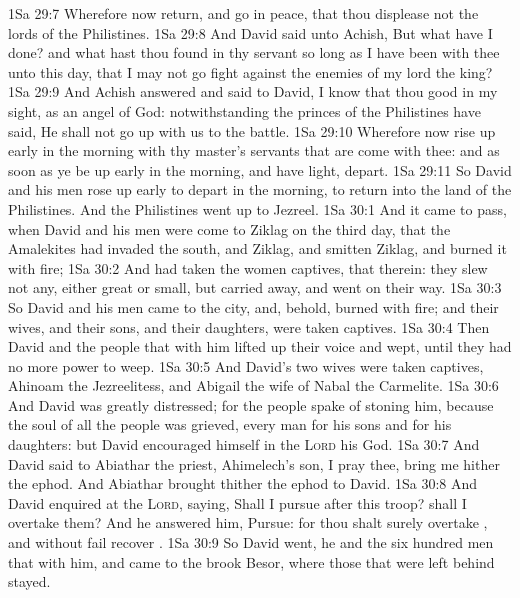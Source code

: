 \vs 1Sa 29:7 Wherefore now return, and go in peace, that thou displease not the lords of the Philistines.
\vs 1Sa 29:8 And David said unto Achish, But what have I done? and what hast thou found in thy servant so long as I have been with thee unto this day, that I may not go fight against the enemies of my lord the king?
\vs 1Sa 29:9 And Achish answered and said to David, I know that thou  good in my sight, as an angel of God: notwithstanding the princes of the Philistines have said, He shall not go up with us to the battle.
\vs 1Sa 29:10 Wherefore now rise up early in the morning with thy master's servants that are come with thee: and as soon as ye be up early in the morning, and have light, depart.
\vs 1Sa 29:11 So David and his men rose up early to depart in the morning, to return into the land of the Philistines. And the Philistines went up to Jezreel.
\vs 1Sa 30:1 And it came to pass, when David and his men were come to Ziklag on the third day, that the Amalekites had invaded the south, and Ziklag, and smitten Ziklag, and burned it with fire;
\vs 1Sa 30:2 And had taken the women captives, that  therein: they slew not any, either great or small, but carried  away, and went on their way.
\vs 1Sa 30:3 So David and his men came to the city, and, behold,  burned with fire; and their wives, and their sons, and their daughters, were taken captives.
\vs 1Sa 30:4 Then David and the people that  with him lifted up their voice and wept, until they had no more power to weep.
\vs 1Sa 30:5 And David's two wives were taken captives, Ahinoam the Jezreelitess, and Abigail the wife of Nabal the Carmelite.
\vs 1Sa 30:6 And David was greatly distressed; for the people spake of stoning him, because the soul of all the people was grieved, every man for his sons and for his daughters: but David encouraged himself in the \textsc{Lord} his God.
\vs 1Sa 30:7 And David said to Abiathar the priest, Ahimelech's son, I pray thee, bring me hither the ephod. And Abiathar brought thither the ephod to David.
\vs 1Sa 30:8 And David enquired at the \textsc{Lord}, saying, Shall I pursue after this troop? shall I overtake them? And he answered him, Pursue: for thou shalt surely overtake , and without fail recover .
\vs 1Sa 30:9 So David went, he and the six hundred men that  with him, and came to the brook Besor, where those that were left behind stayed.
